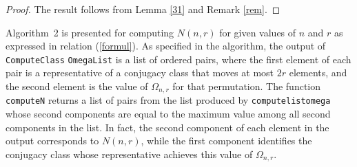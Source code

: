 \documentclass{amsart}
\numberwithin{equation}{section}
\begin{document}
\begin{proof}
The result follows from Lemma \ref{31} and Remark \ref{rem}.
\end{proof}
Algorithm~2 is presented for computing $N(n,r)$ for given values of $n$ and $r$ as expressed in relation (\ref{formul}).
As specified in the algorithm, the output of \texttt{ComputeClass} \texttt{OmegaList} is a list of ordered pairs, where the first element of each pair is a representative of a conjugacy class that moves at most $2r$ elements, and the second element is the value of $\Omega_{n,r}$ for that permutation. The function \texttt{computeN} returns a list of pairs from the list produced by \texttt{computelistomega} whose second components are equal to the maximum value among all second components in the list.  
In fact, the second component of each element in the output corresponds to $N(n,r)$, while the first component identifies the conjugacy class whose representative achieves this value of $\Omega_{n,r}$.
\end{document}
